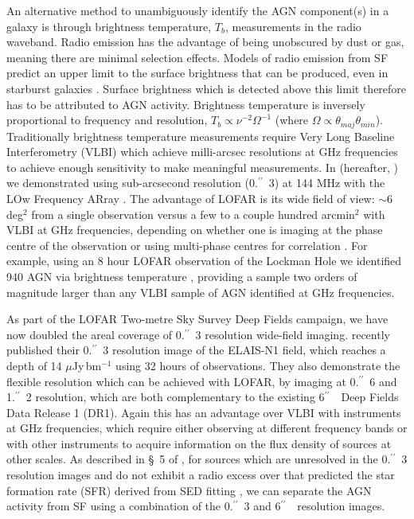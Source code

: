 \documentclass[usenatbib,fleqn,letters]{mnras}
\newcommand{\sarc}{$^{\prime\prime}\!\!$}
\begin{document}
An alternative method to unambiguously identify the AGN component(s) in a galaxy is through brightness temperature, $T_b$, measurements in the radio waveband. Radio emission has the advantage of being unobscured by dust or gas, meaning there are minimal selection effects. %
Models of radio emission from SF predict an upper limit to the surface brightness that can be produced, even in starburst galaxies \citep{condon_radio_1992}. Surface brightness which is detected above this limit therefore has to be attributed to AGN activity. Brightness temperature is inversely proportional to frequency and resolution, $T_b \propto \nu^{-2}\Omega^{-1}$ (where $\Omega \propto \theta_{maj}\theta_{min}$). Traditionally brightness temperature measurements require Very Long Baseline Interferometry (VLBI) which achieve milli-arcsec resolutions at GHz frequencies \citep[e.g.,][]{middelberg_mosaiced_2013,herrera_ruiz_faint_2017,radcliffe_nowhere_2018} to achieve enough sensitivity to make meaningful measurements. In \cite{morabito_identifying_2022} (hereafter, ) we demonstrated using sub-arcsecond resolution (0.\sarc\ 3) at 144 MHz with the LOw Frequency ARray \citep[LOFAR;][]{van_haarlem_lofar:_2013}. The advantage of LOFAR is its wide field of view: $\sim$6 deg$^2$ from a single observation versus a few to a couple hundred arcmin$^2$ with VLBI at GHz frequencies, depending on whether one is imaging at the phase centre of the observation or using multi-phase centres for correlation \citep{deller_difx-2:_2011,morgan_vlbi_2011}. For example, using an 8 hour LOFAR observation of the Lockman Hole \citep{sweijen_deep_2022} we identified 940 AGN via brightness temperature , providing a sample two orders of magnitude larger than any VLBI sample of AGN identified at GHz frequencies. 

As part of the LOFAR Two-metre Sky Survey Deep Fields \citep{sabater_lofar_2021,tasse_lofar_2021} campaign, we have now doubled the areal coverage of 0.\sarc\ 3 resolution wide-field imaging. \cite{de_jong_into_2024} recently published their 0.\sarc\ 3 resolution image of the ELAIS-N1 field, which reaches a depth of 14 $\mu$Jy$\,$bm$^{-1}$ using 32 hours of observations. They also demonstrate the flexible resolution which can be achieved with LOFAR, by imaging at 0.\sarc\ 6 and 1.\sarc\ 2 resolution, which are both complementary to the existing 6\sarc\ \ Deep Fields Data Release 1 (DR1). Again this has an advantage over VLBI with instruments at GHz frequencies, which require either observing at different frequency bands or with other instruments to acquire information on the flux density of sources at other scales. As described in \S~5 of , for sources which are unresolved in the 0.\sarc\ 3 resolution images and do not exhibit a radio excess over that predicted the star formation rate (SFR) derived from SED fitting \citep[see][for more details]{best_lofar_2023}, we can separate the AGN activity from SF using a combination of the 0.\sarc\ 3 and 6\sarc\ \ resolution images. 
\end{document}

